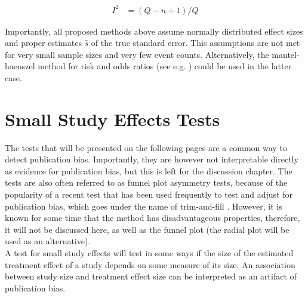 \documentclass[11pt,a4paper,twoside]{book}\usepackage[]{graphicx}\usepackage[]{color}
\begin{document}
\begin{align}
I^2 &= (Q - n + 1)/Q \nonumber%
\end{align}

Importantly, all proposed methods above assume normally distributed effect sizes and proper estimates $\hat{s}$ of the true standard error. This assumptions are not met for very small sample sizes and very few event counts. Alternatively, the mantel-haenszel method for risk and odds ratios (see e.g. \citet{mantel.haenszel}) could be used in the latter case. 










\section{Small Study Effects Tests}
The tests that will be presented on the following pages are a common way to detect publication bias. Importantly, they are however not interpretable directly as evidence for publication bias, but this is left for the discussion chapter. The tests are also often referred to as funnel plot asymmetry tests, because of the popularity of a recent test that has been used frequently to test and adjust for publication bias, which goes under the name of trim-and-fill \citet{trimfill}. However, it is known for some time that the method has disadvantageous properties, therefore, it will not be discussed here, as well as the funnel plot (the radial plot will be used as an alternative).\\
A test for small study effects will test in some ways if the size of the estimated treatment effect of a study depends on some measure of its size. An association between study size and treatment effect size can be interpreted as an artifact of publication bias.
\end{document}
